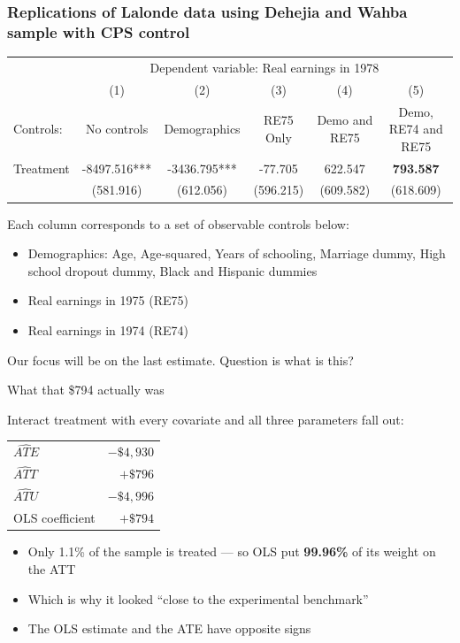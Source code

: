 \documentclass{beamer}
\newcommand{\highlight}[1]{\textcolor{accent}{\textbf{#1}}}
\begin{document}
\begin{frame}
\frametitle{Replications of Lalonde data using Dehejia and Wahba sample with CPS control}

\tiny
\begin{tabular}{lccccc}
\hline \hline
 & \multicolumn{5}{c}{Dependent variable: Real earnings in 1978} \\
 & (1) & (2) & (3) & (4) & (5) \\
Controls: & No controls & Demographics & RE75 Only & Demo and RE75 & Demo, RE74 and RE75 \\
\hline
Treatment                 &   -8497.516***&   -3436.795***&     -77.705   &     622.547   &     \textbf{793.587}   \\
                    		&   (581.916)   &   (612.056)   &   (596.215)   &   (609.582)   &   (618.609)   \\
\hline \end{tabular}

\bigskip

Each column corresponds to a set of observable controls below:
\begin{itemize}
\item Demographics: Age, Age-squared, Years of schooling, Marriage dummy, High school dropout dummy, Black and Hispanic dummies
\item Real earnings in 1975 (RE75)
\item Real earnings in 1974 (RE74)
\end{itemize}

Our focus will be on the last estimate.  Question is what is this?

\end{frame}



\begin{frame}{What that \$794 actually was}

Interact treatment with every covariate and all three parameters fall out:

\vspace{0.5em}

\centering
{\small
\begin{tabular}{lr}
\toprule
$\widehat{ATE}$ & $-\$4{,}930$ \\
$\widehat{ATT}$ & $+\$796$ \\
$\widehat{ATU}$ & $-\$4{,}996$ \\
\midrule
OLS coefficient & $+\$794$ \\
\bottomrule
\end{tabular}}

\vspace{0.7em}
\raggedright

\begin{itemize}
\item Only 1.1\% of the sample is treated --- so OLS put \highlight{99.96\%} of its weight on the ATT
\item Which is why it looked ``close to the experimental benchmark''
\item \alert{The OLS estimate and the ATE have opposite signs}
\end{itemize}

\end{frame}
\end{document}
